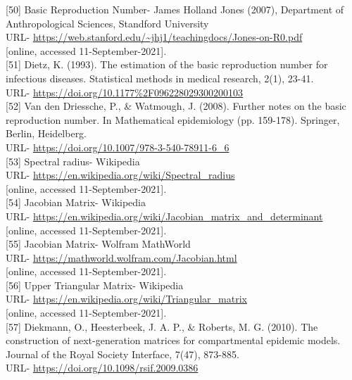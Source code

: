 [50] Basic Reproduction Number- James Holland Jones (2007), Department of Anthropological Sciences, Standford University \\
URL- \url{https://web.stanford.edu/~jhj1/teachingdocs/Jones-on-R0.pdf} \\
{[online, accessed 11-September-2021]}. \\

[51] Dietz, K. (1993). The estimation of the basic reproduction number for infectious diseases. Statistical methods in medical research, 2(1), 23-41. \\
URL- \url{https://doi.org/10.1177%2F096228029300200103} \\

[52] Van den Driessche, P., \& Watmough, J. (2008). Further notes on the basic reproduction number. In Mathematical epidemiology (pp. 159-178). Springer, Berlin, Heidelberg. \\
URL- \url{https://doi.org/10.1007/978-3-540-78911-6_6} \\

[53] Spectral radius- Wikipedia \\
URL- \url{https://en.wikipedia.org/wiki/Spectral_radius} \\
{[online, accessed 11-September-2021]}. \\

[54] Jacobian Matrix- Wikipedia \\
URL- \url{https://en.wikipedia.org/wiki/Jacobian_matrix_and_determinant} \\
{[online, accessed 11-September-2021]}. \\

[55] Jacobian Matrix- Wolfram MathWorld \\
URL- \url{https://mathworld.wolfram.com/Jacobian.html} \\
{[online, accessed 11-September-2021]}. \\

[56] Upper Triangular Matrix- Wikipedia \\
URL- \url{https://en.wikipedia.org/wiki/Triangular_matrix} \\
{[online, accessed 11-September-2021]}. \\

[57] Diekmann, O., Heesterbeek, J. A. P., \& Roberts, M. G. (2010). The construction of next-generation matrices for compartmental epidemic models. Journal of the Royal Society Interface, 7(47), 873-885. \\
URL- \url{https://doi.org/10.1098/rsif.2009.0386} \\


